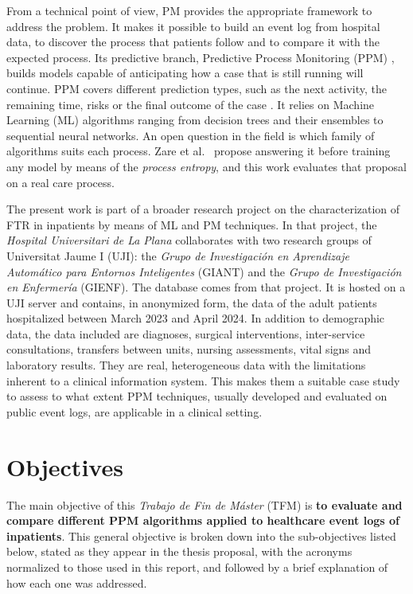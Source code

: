 From a technical point of view, PM \cite{aalst2016} provides the appropriate framework to address the problem. It makes it possible to build an event log from hospital data, to discover the process that patients follow and to compare it with the expected process. Its predictive branch, Predictive Process Monitoring (PPM) \cite{difrancescomarino2022,teinemaa2019}, builds models capable of anticipating how a case that is still running will continue. PPM covers different prediction types, such as the next activity, the remaining time, risks or the final outcome of the case \cite{difrancescomarino2022}. It relies on Machine Learning (ML) algorithms ranging from decision trees and their ensembles to sequential neural networks. An open question in the field is which family of algorithms suits each process. Zare et al.\ \cite{zare2025} propose answering it before training any model by means of the \emph{process entropy}, and this work evaluates that proposal on a real care process.

The present work is part of a broader research project on the characterization of FTR in inpatients by means of ML and PM techniques. In that project, the \emph{Hospital Universitari de La Plana} collaborates with two research groups of Universitat Jaume I (UJI): the \emph{Grupo de Investigaci\'on en Aprendizaje Autom\'atico para Entornos Inteligentes} (GIANT) and the \emph{Grupo de Investigaci\'on en Enfermer\'ia} (GIENF). The  database comes from that project. It is hosted on a UJI server and contains, in anonymized form, the data of the adult patients hospitalized between March 2023 and April 2024. In addition to demographic data, the data included are diagnoses, surgical interventions, inter-service consultations, transfers between units, nursing assessments, vital signs and laboratory results. They are real, heterogeneous data with the limitations inherent to a clinical information system. This makes them a suitable case study to assess to what extent PPM techniques, usually developed and evaluated on public event logs, are applicable in a clinical setting.

\section{Objectives}
\label{sec:objetivos}

The main objective of this \emph{Trabajo de Fin de M\'aster} (TFM) is \textbf{to evaluate and compare different PPM algorithms applied to healthcare event logs of inpatients}. This general objective is broken down into the sub-objectives listed below, stated as they appear in the thesis proposal, with the acronyms normalized to those used in this report, and followed by a brief explanation of how each one was addressed.

